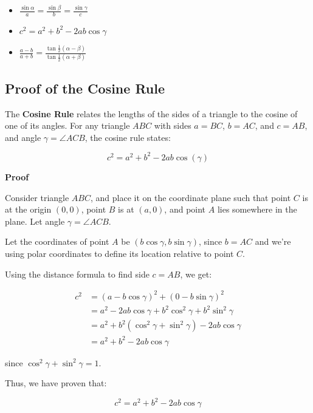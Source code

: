 \begin{itemize}[label =\(-\)]
	\item \(\frac{\sin \alpha}{a} = \frac{\sin \beta}{b} = \frac{\sin \gamma}{c}\)
	\item \(c^2 = a^2 + b^2 - 2ab \cos \gamma\)
	\item \(\frac{a - b}{a + b} = \frac{\tan \frac{1}{2}(\alpha - \beta)}{\tan \frac{1}{2} (\alpha + \beta)}\)
\end{itemize}

\subsection{Proof of the Cosine Rule}

The \textbf{Cosine Rule} relates the lengths of the sides of a triangle to the cosine of one of its angles. For any triangle \( ABC \) with sides \( a = BC \), \( b = AC \), and \( c = AB \), and angle \( \gamma = \angle ACB \), the cosine rule states:

\[
c^2 = a^2 + b^2 - 2ab\cos(\gamma)
\]

\textbf{Proof}

\noindent Consider triangle \( ABC \), and place it on the coordinate plane such that point \( C \) is at the origin \( (0,0) \), point \( B \) is at \( (a,0) \), and point \( A \) lies somewhere in the plane. Let angle \( \gamma = \angle ACB \).

Let the coordinates of point \( A \) be \( (b\cos\gamma, b\sin\gamma) \), since \( b = AC \) and we’re using polar coordinates to define its location relative to point \( C \).

Using the distance formula to find side \( c = AB \), we get:

\begin{align*}
c^2 &= (a - b\cos\gamma)^2 + (0 - b\sin\gamma)^2 \\
&= a^2 - 2ab\cos\gamma + b^2\cos^2\gamma + b^2\sin^2\gamma \\
&= a^2 + b^2(\cos^2\gamma + \sin^2\gamma) - 2ab\cos\gamma \\
&= a^2 + b^2 - 2ab\cos\gamma
\end{align*}

since \( \cos^2\gamma + \sin^2\gamma = 1 \).

Thus, we have proven that:

\[
c^2 = a^2 + b^2 - 2ab\cos\gamma
\]


\newpage